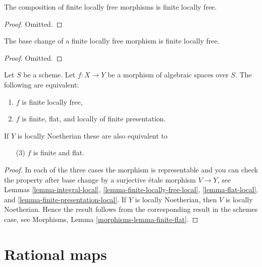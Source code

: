 \begin{lemma}
\label{lemma-composition-finite-locally-free}
The composition of finite locally free morphisms is finite locally free.
\end{lemma}

\begin{proof}
Omitted.
\end{proof}

\begin{lemma}
\label{lemma-base-change-finite-locally-free}
The base change of a finite locally free morphism is finite locally free.
\end{lemma}

\begin{proof}
Omitted.
\end{proof}

\begin{lemma}
\label{lemma-finite-flat}
Let $S$ be a scheme.
Let $f : X \to Y$ be a morphism of algebraic spaces over $S$.
The following are equivalent:
\begin{enumerate}
\item $f$ is finite locally free,
\item $f$ is finite, flat, and locally of finite presentation.
\end{enumerate}
If $Y$ is locally Noetherian these are also equivalent to
\begin{enumerate}
\item[(3)] $f$ is finite and flat.
\end{enumerate}
\end{lemma}

\begin{proof}
In each of the three cases the morphism is representable and you
can check the property after base change by a surjective \'etale morphism
$V \to Y$, see
Lemmas \ref{lemma-integral-local},
\ref{lemma-finite-locally-free-local},
\ref{lemma-flat-local}, and
\ref{lemma-finite-presentation-local}.
If $Y$ is locally Noetherian, then $V$ is locally Noetherian.
Hence the result follows from the corresponding result
in the schemes case, see
Morphisms, Lemma \ref{morphisms-lemma-finite-flat}.
\end{proof}





\section{Rational maps}
\label{section-rational-maps}

